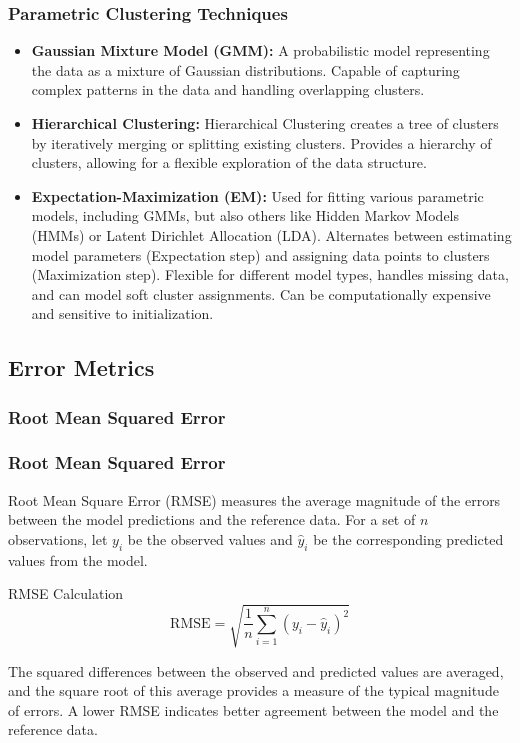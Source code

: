 \documentclass[xcolor={dvipsnames}]{beamer}
\begin{document}
\begin{frame}
\frametitle{Parametric Clustering Techniques}
\begin{itemize}

    \item \textbf{Gaussian Mixture Model (GMM):} A probabilistic model representing the data as a mixture of Gaussian distributions. Capable of capturing complex patterns in the data and handling overlapping clusters.

    \item \textbf{Hierarchical Clustering:} Hierarchical Clustering creates a tree of clusters by iteratively merging or splitting existing clusters. Provides a hierarchy of clusters, allowing for a flexible exploration of the data structure.

    \item \textbf{Expectation-Maximization (EM):} Used for fitting various parametric models, including GMMs, but also others like Hidden Markov Models (HMMs) or Latent Dirichlet Allocation (LDA). Alternates between estimating model parameters (Expectation step) and assigning data points to clusters (Maximization step). Flexible for different model types, handles missing data, and can model soft cluster assignments. Can be computationally expensive and sensitive to initialization.
\end{itemize}
\end{frame}

\subsection{Error Metrics}

\subsubsection{Root Mean Squared Error}
\begin{frame}
\frametitle{Root Mean Squared Error}

Root Mean Square Error (RMSE) measures the average magnitude of the errors between the model predictions and the reference data. For a set of $n$ observations, let $y_i$ be the observed values and $\hat{y}_i$ be the corresponding predicted values from the model.

\begin{alertblock}{RMSE Calculation}
\[
\text{RMSE} = \sqrt{\frac{1}{n} \sum_{i=1}^{n} (y_i - \hat{y}_i)^2}
\]
\end{alertblock}

\pause

The squared differences between the observed and predicted values are averaged, and the square root of this average provides a measure of the typical magnitude of errors. A lower RMSE indicates better agreement between the model and the reference data.
    
\end{frame}
\end{document}
